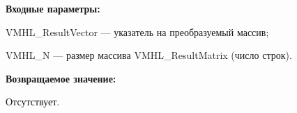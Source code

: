 \textbf{Входные параметры:}
 
VMHL\_ResultVector --- указатель на преобразуемый массив;
 
VMHL\_N --- размер массива VMHL\_ResultMatrix (число строк).

\textbf{Возвращаемое значение:}

Отсутствует.